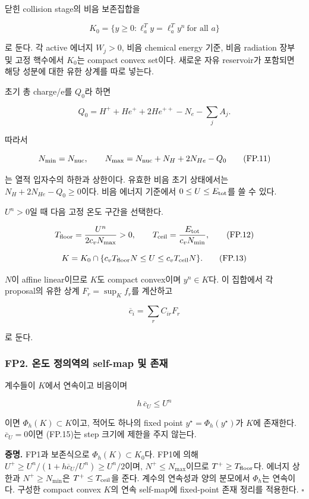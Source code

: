 닫힌 collision stage의 비음 보존집합을

\[
K_0=\{y\ge0:\ell_a^Ty=\ell_a^Ty^n\ \text{for all }a\}
\tag{FP.10}
\]

로 둔다. 각 active 에너지 \(W_j>0\), 비음 chemical energy 기준, 비음 radiation 장부 및 고정 핵수에서 \(K_0\)는 compact convex set이다. 새로운 자유 reservoir가 포함되면 해당 성분에 대한 유한 상계를 따로 넣는다.

초기 총 charge/e를 \(Q_0\)라 하면

\[
Q_0=H^++He^++2He^{++}-N_e-\sum_jA_j.
\]

따라서

\[
N_{\min}=N_{\rm nuc},\qquad
N_{\max}=N_{\rm nuc}+N_H+2N_{He}-Q_0
\tag{FP.11}
\]

는 열적 입자수의 하한과 상한이다. 유효한 비음 초기 상태에서는 \(N_H+2N_{He}-Q_0\ge0\)이다. 비음 에너지 기준에서 \(0\le U\le E_{\rm tot}\)를 쓸 수 있다.

\(U^n>0\)일 때 다음 고정 온도 구간을 선택한다.

\[
T_{\rm floor}=\frac{U^n}{2c_vN_{\max}}>0,\qquad
T_{\rm ceil}=\frac{E_{\rm tot}}{c_vN_{\min}},
\tag{FP.12}
\]

\[
K=K_0\cap\{c_vT_{\rm floor}N\le U
\le c_vT_{\rm ceil}N\}.
\tag{FP.13}
\]

\(N\)이 affine linear이므로 \(K\)도 compact convex이며 \(y^n\in K\)다. 이 집합에서 각 proposal의 유한 상계 \(F_r=\sup_Kf_r\)를 계산하고

\[
\overline c_i=\sum_r C_{ir}F_r
\tag{FP.14}
\]

로 둔다.

\hypertarget{fp2.-uxc628uxb3c4-uxc815uxc758uxc5eduxc758-self-map-uxbc0f-uxc874uxc7ac}{%
\subsubsection{FP2. 온도 정의역의 self-map 및 존재}\label{fp2.-uxc628uxb3c4-uxc815uxc758uxc5eduxc758-self-map-uxbc0f-uxc874uxc7ac}}

계수들이 \(K\)에서 연속이고 비음이며

\[
\boxed{h\,\overline c_U\le U^n}
\tag{FP.15}
\]

이면 \(\Phi_h(K)\subset K\)이고, 적어도 하나의 fixed point \(y^\star=\Phi_h(y^\star)\)가 \(K\)에 존재한다. \(\overline c_U=0\)이면 (FP.15)는 step 크기에 제한을 주지 않는다.

\textbf{증명.} FP1과 보존식으로 \(\Phi_h(K)\subset K_0\)다. FP1에 의해 \(U^+\ge U^n/(1+h\overline c_U/U^n)\ge U^n/2\)이며, \(N^+\le N_{\max}\)이므로 \(T^+\ge T_{\rm floor}\)다. 에너지 상한과 \(N^+\ge N_{\min}\)은 \(T^+\le T_{\rm ceil}\)을 준다. 계수의 연속성과 양의 분모에서 \(\Phi_h\)는 연속이다. 구성한 compact convex \(K\)의 연속 self-map에 fixed-point 존재 정리를 적용한다. \(\square\)

